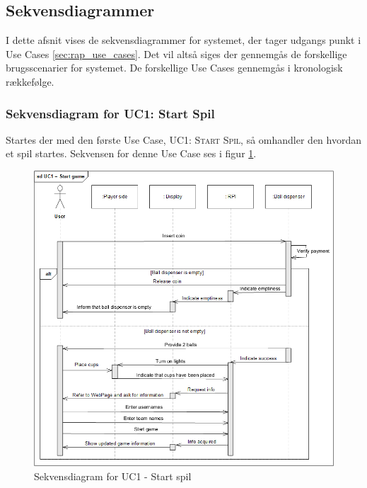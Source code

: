 \documentclass[Rapport/Rapport_main.tex]{subfiles}
\begin{document}
\subsection{Sekvensdiagrammer}
I dette afsnit vises de sekvensdiagrammer for systemet, der tager udgangs punkt i Use Cases \ref{sec:rap_use_cases}. Det vil altså siges der gennemgås de forskellige brugsscenarier for systemet. De forskellige Use Cases gennemgås i kronologisk rækkefølge.

\subsubsection{Sekvensdiagram for UC1: Start Spil}
Startes der med den første Use Case, \textsc{UC1: Start Spil}, så omhandler den hvordan et spil startes. Sekvensen for denne Use Case ses i figur \ref{fig:rap_sd_UC1}.
\begin{figure}
    \centering
    \includegraphics[scale=0.75]{Arkitektur/Sekvensdiagrammer/graphics/sd_UC1.png}
    \caption{Sekvensdiagram for UC1 - Start spil}
    \label{fig:rap_sd_UC1}
\end{figure}
\end{document}
